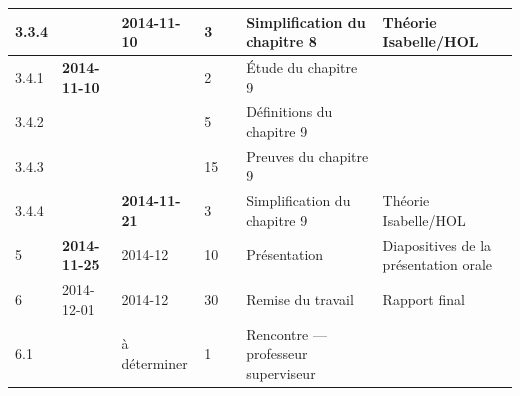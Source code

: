 \documentclass[a4paper, oneside, 12pt, titlepage]{article}
\begin{document}
\begin{landscape}
\begin{table}[!h]
\begin{tabular}{|l||l|l|p{1.6cm}|p{1.6cm}||l|l|}
    3.3.4 &                     & \textbf{2014-11-10} & 3  & & Simplification du chapitre 8 & Théorie Isabelle/HOL \\
    \hline
    3.4.1 & \textbf{2014-11-10} &                     & 2  & & Étude du chapitre 9 & \\
    3.4.2 &                     &                     & 5  & & Définitions du chapitre 9 & \\
    3.4.3 &                     &                     & 15 & & Preuves du chapitre 9 & \\
    3.4.4 &                     & \textbf{2014-11-21} & 3  & & Simplification du chapitre 9 & Théorie Isabelle/HOL \\
    \hline
    5 & \textbf{2014-11-25} & 2014-12 & 10 & & Présentation & Diapositives de la présentation orale \\
    \hline
    6   & 2014-12-01 & 2014-12      & 30 & & Remise du travail & Rapport final \\
    6.1 &            & à déterminer & 1  & & Rencontre --- professeur superviseur & \\
    \hline
  \end{tabular}
\end{table}

\end{landscape}
\restoregeometry
\end{document}
